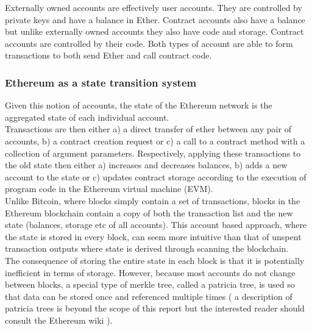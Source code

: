 Externally owned accounts are effectively user accounts. They are controlled by private keys and have a balance in Ether. Contract accounts also have a balance but unlike externally owned accounts they also have code and storage. Contract accounts are controlled by their code. Both types of account are able to form transactions to both send Ether and call contract code.\\

\subsubsection{Ethereum as a state transition system}
Given this notion of accounts, the state of the Ethereum network is the aggregated state of each individual account. \\

Transactions are then either a) a direct transfer of ether between any pair of accounts, b) a contract creation request or c) a call to a contract method with a collection of argument parameters. Respectively, applying these transactions to the old state then either a) increases and decreases balances, b) adds a new account to the state or c) updates contract storage according to the execution of program code in the Ethereum virtual machine (EVM). \\

Unlike Bitcoin, where blocks simply contain a set of transactions, blocks in the Ethereum blockchain contain a copy of both the transaction list and the new state (balances, storage etc of all accounts). This account based approach, where the state is stored in every block, can seem more intuitive than that of unspent transaction outputs where state is derived through scanning the blockchain.\\

The consequence of storing the entire state in each block is that it is potentially inefficient in terms of storage. However, because most accounts do not change between blocks, a special type of merkle tree, called a patricia tree, is used so that data can be stored once and referenced multiple times ( a description of patricia trees is beyond the scope of this report but the interested reader should consult the Ethereum wiki \cite{Patricia}).\\

